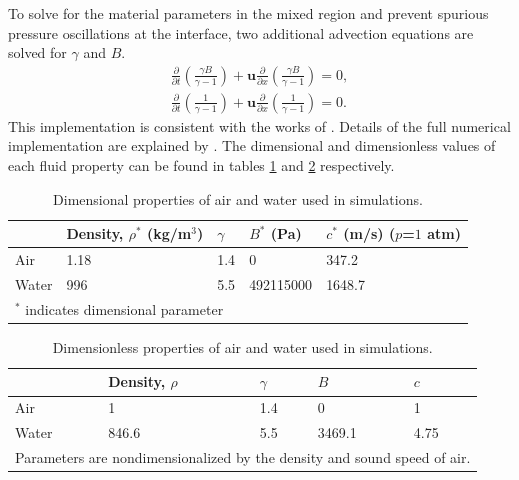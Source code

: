 To solve for
the material parameters in the mixed region and prevent spurious
pressure oscillations at the interface, two additional advection
equations are solved for $\gamma$ and $B$.
\begin{subequations} \label{usbe_lung_eosvar_advection}%
  \begin{align}%
    \frac{\partial}{\partial t}\left(\frac{\gamma B}{\gamma-1}\right)+\boldsymbol{u}\frac{\partial}{\partial x}\left(\frac{\gamma B}{\gamma-1}\right) = 0,\\
    \frac{\partial}{\partial t}\left(\frac{1}{\gamma-1}\right)+\boldsymbol{u}\frac{\partial}{\partial x}\left(\frac{1}{\gamma-1}\right) = 0. 
  \end{align}%
\end{subequations}%
This implementation is consistent with the works of \cite{Abgrall1996,
  Shyue2001, Beig2015}. Details of the full numerical implementation
are explained by \cite{HenrydeFrahan2015}.
%
The dimensional and dimensionless values of each fluid property can be
found in tables \ref{tab:usbe_lung_dimensional_parameters} and
\ref{tab:usbe_lung_dimensionless_parameters} respectively.
% 
\begin{table}[bp]%
  \begin{center}
    \caption{Dimensional properties of air and water used in simulations.}
    \label{tab:usbe_lung_dimensional_parameters}%
    \begin{tabularx}{0.75\textwidth}{| X | X | X | X | X |}
      \hline
      & Density, $\rho^*$ (kg/m$^3$) & $\gamma$ & $B^*$ (Pa)  & $c^*$ (m/s) ($p$=$1$ atm) \\ \hline
      Air   & 1.18                        & 1.4      & 0         & 347.2     \\ \hline
      Water & 996                           & 5.5      & 492115000 & 1648.7     \\ \hline
      \multicolumn{5}{l}{\small $^*$ indicates dimensional parameter}
    \end{tabularx}
  \end{center}
\end{table}%
\begin{table}[bp]%
  \begin{center}
    \caption{Dimensionless properties of air and water used in simulations.}
    \label{tab:usbe_lung_dimensionless_parameters}%
    \begin{tabularx}{0.75\textwidth}{| X | X | X | X | X |}
      \hline
      & Density, $\rho$ & $\gamma$ & $B$ & $c$ \\ \hline
      Air   & 1                          & 1.4      & 0         & 1          \\ \hline
      Water & 846.6                      & 5.5      & 3469.1    & 4.75       \\ \hline
      \multicolumn{5}{l}{\small Parameters are nondimensionalized by the density and sound speed of air. }
    \end{tabularx}
  \end{center}
\end{table}
% 
